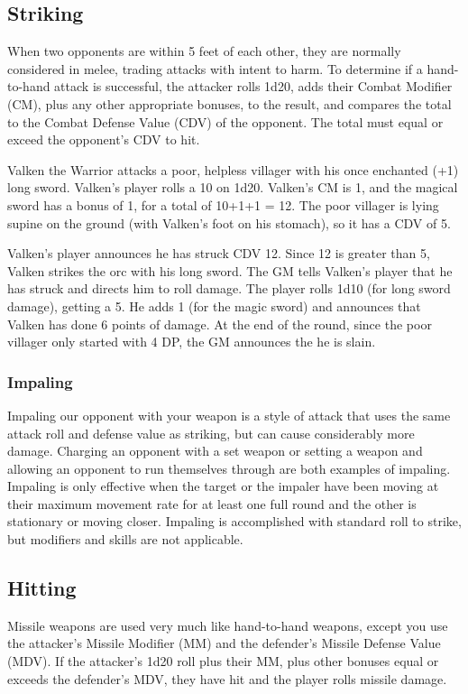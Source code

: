 \subsection{Striking}
When two opponents are within 5 feet of each other, they are normally considered in melee, trading attacks with intent to harm. To determine if a hand-to-hand attack is successful, the attacker rolls 1d20, adds their Combat Modifier (CM), plus any other appropriate bonuses, to the result, and compares the total to the Combat Defense Value (CDV) of the opponent. The total must equal or exceed the opponent's CDV to hit.

Valken the Warrior attacks a poor, helpless villager with his once enchanted (+1) long sword. Valken's player rolls a 10 on 1d20. Valken's CM is 1, and the magical sword has a bonus of 1, for a total of 10+1+1 = 12. The poor villager is lying supine on the ground (with Valken's foot on his stomach), so it has a CDV of 5.

Valken's player announces he has struck CDV 12. Since 12 is greater than 5, Valken strikes the orc with his long sword. The GM tells Valken's player that he has struck and directs him to roll damage. The player rolls 1d10 (for long sword damage), getting a 5. He adds 1 (for the magic sword) and announces that Valken has done 6 points of damage. At the end of the round, since the poor villager only started with 4 DP, the GM announces the he is slain.
\subsubsection{Impaling}
Impaling our opponent with your weapon is a style of attack that uses the same attack roll and defense value as striking, but can cause considerably more damage. Charging an opponent with a set weapon or setting a weapon and allowing an opponent to run themselves through are both examples of impaling. Impaling is only effective when the target or the impaler have been moving at their maximum movement rate for at least one full round and the other is stationary or moving closer. Impaling is accomplished with  standard roll to strike, but modifiers and skills are not applicable.
\subsection{Hitting}
Missile weapons are used very much like hand-to-hand weapons, except you use the attacker's Missile Modifier (MM) and the defender's Missile Defense Value (MDV). If the attacker's 1d20 roll plus their MM, plus other bonuses equal or exceeds the defender's MDV, they have hit and the player rolls missile damage.
